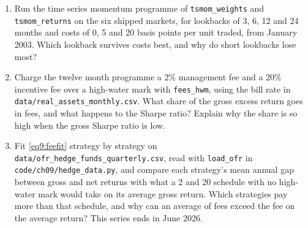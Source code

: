 \begin{chapterrefs}
\begin{enumerate}[label=\textbf{P9.\arabic*}, leftmargin=*, ref=P9.\arabic*]
\item Run the time series momentum programme of \texttt{tsmom\_weights} and \texttt{tsmom\_returns} on the six
shipped markets, for lookbacks of 3, 6, 12 and 24 months and costs of 0, 5 and 20 basis points per unit
traded, from January 2003. Which lookback survives costs best, and why do short lookbacks lose most?
\item Charge the twelve month programme a 2\% management fee and a 20\% incentive fee over a high-water mark
with \texttt{fees\_hwm}, using the bill rate in \texttt{data/real\_assets\_monthly.csv}. What share of the
gross excess return goes in fees, and what happens to the Sharpe ratio? Explain why the share is so high
when the gross Sharpe ratio is low.
\item Fit \cref{eq9:feefit} strategy by strategy on \texttt{data/ofr\_hedge\_funds\_quarterly.csv}, read
with \texttt{load\_ofr} in \texttt{code/ch09/hedge\_data.py}, and compare each strategy's mean annual
gap between gross and net returns with what a 2 and 20 schedule with no high-water mark would take on
its average gross return. Which strategies pay more than that schedule, and why can an average of fees
exceed the fee on the average return? This series ends in June 2026.
\end{enumerate}


\end{chapterrefs}
